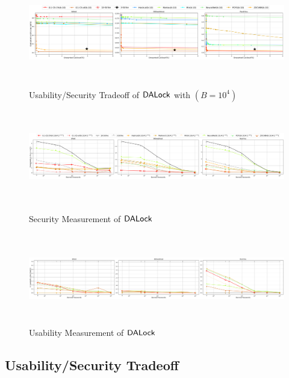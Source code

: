 
\vspace*{-\baselineskip}
\begin{figure}[h]
	\includegraphics[width=\linewidth, height = 4cm]{Figures/Experiments/B10000.png}
		\vspace{-0.25in}
	\caption{Usability/Security Tradeoff of $\mathsf{DALock}$ with $(B=10^4)$ }
	\label{figure:UseSecTradeoff}
	\includegraphics[width=\linewidth, height = 4cm]{Figures/Experiments/Attacker/SecurityBigPicture.png}
	\vspace{-0.25in}
	\caption{Security Measurement of $\mathsf{DALock}$ }\label{figure:Security}
	\includegraphics[width=\linewidth, height = 4cm]{Figures/Experiments/Utility/UsabilityBigPicture.png}
	\vspace{-0.25in}
	\caption{Usability Measurement of $\mathsf{DALock}$ }\label{figure:Usability}
	\vspace{-0.25in}
\end{figure}









\subsection{Usability/Security Tradeoff}

